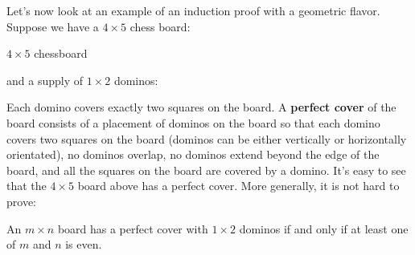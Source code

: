 \begin{exmp}
 Let's now look at an example of an induction proof with a geometric flavor. Suppose we
 have a $4\times 5 $ chess board:
 
 \begin{marginfigure}
   \caption{$4\times 5$ chessboard}
 \end{marginfigure}

 
 and a supply of $1\times 2$ dominos:

 
 Each domino covers exactly two squares on the board. A {\bfseries perfect cover} of
 the board consists of a placement of dominos on the board so that each domino
 covers two squares on the board (dominos can be either vertically or horizontally
 orientated), no dominos overlap, no dominos extend beyond the edge of the board,
 and all the squares on the board are covered by a domino. It's easy to see that
 the $4\times 5$ board above has a perfect cover. More generally, it is not
 hard to prove:
 
 \begin{thm}
  An $m\times n$ board has a perfect cover with $1\times 2$ dominos  if and only
  if at least one of $m$ and $n$ is even.
 \end{thm} 
\end{exmp}


